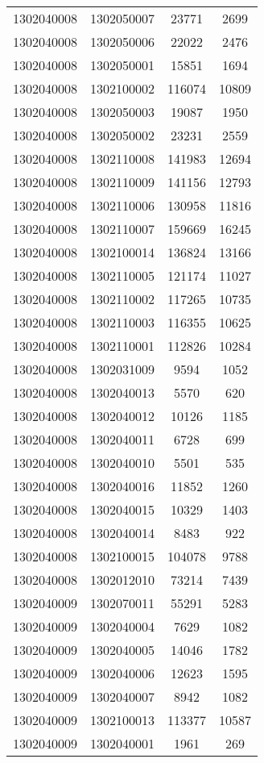 \begin{longtable}{llcc}
1302040008 & 1302050007 & 23771 & 2699\\
1302040008 & 1302050006 & 22022 & 2476\\
1302040008 & 1302050001 & 15851 & 1694\\
1302040008 & 1302100002 & 116074 & 10809\\
1302040008 & 1302050003 & 19087 & 1950\\
1302040008 & 1302050002 & 23231 & 2559\\
1302040008 & 1302110008 & 141983 & 12694\\
1302040008 & 1302110009 & 141156 & 12793\\
1302040008 & 1302110006 & 130958 & 11816\\
1302040008 & 1302110007 & 159669 & 16245\\
1302040008 & 1302100014 & 136824 & 13166\\
1302040008 & 1302110005 & 121174 & 11027\\
1302040008 & 1302110002 & 117265 & 10735\\
1302040008 & 1302110003 & 116355 & 10625\\
1302040008 & 1302110001 & 112826 & 10284\\
1302040008 & 1302031009 & 9594 & 1052\\
1302040008 & 1302040013 & 5570 & 620\\
1302040008 & 1302040012 & 10126 & 1185\\
1302040008 & 1302040011 & 6728 & 699\\
1302040008 & 1302040010 & 5501 & 535\\
1302040008 & 1302040016 & 11852 & 1260\\
1302040008 & 1302040015 & 10329 & 1403\\
1302040008 & 1302040014 & 8483 & 922\\
1302040008 & 1302100015 & 104078 & 9788\\
1302040008 & 1302012010 & 73214 & 7439\\
1302040009 & 1302070011 & 55291 & 5283\\
1302040009 & 1302040004 & 7629 & 1082\\
1302040009 & 1302040005 & 14046 & 1782\\
1302040009 & 1302040006 & 12623 & 1595\\
1302040009 & 1302040007 & 8942 & 1082\\
1302040009 & 1302100013 & 113377 & 10587\\
1302040009 & 1302040001 & 1961 & 269\\

\end{longtable}
